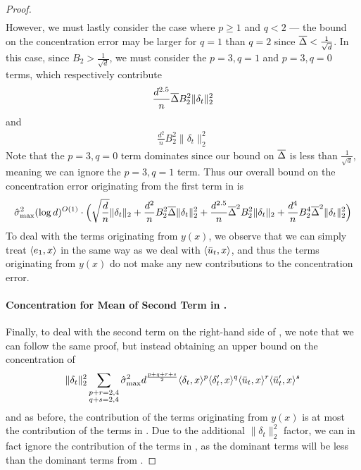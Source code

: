 \begin{proof}
\begin{align}
\end{align}
However, we must lastly consider the case where $p \geq 1$ and $q < 2$ --- the bound on the concentration error may be larger for $q = 1$ than $q = 2$ since $\overline{\Delta} < \frac{1}{\sqrt{d}}$. In this case, since $B_2 > \frac{1}{\sqrt{d}}$, we must consider the $p = 3, q = 1$ and $p = 3, q = 0$ terms, which respectively contribute
\begin{align}
\frac{d^{2.5}}{n} \overline{\Delta} B_2^2 \|\delta_t\|_2^2
\end{align}
and
\begin{align}
\frac{d^2}{n} B_2^2 \|\delta_t\|_2^2
\end{align}
Note that the $p = 3, q = 0$ term dominates since our bound on $\overline{\Delta}$ is less than $\frac{1}{\sqrt{d}}$, meaning we can ignore the $p = 3, q = 1$ term. Thus our overall bound on the concentration error originating from the first term in  is
\begin{align}
\hat{\sigma}_{\textup{max}}^2 (\log d)^{O(1)} \cdot \Big(\sqrt{\frac{d}{n}} \|\delta_t\|_2 + \frac{d^2}{n} B_2^2 \overline{\Delta} \|\delta_t\|_2^2 + \frac{d^{2.5}}{n} \overline{\Delta}^2 B_2^2 \|\delta_t\|_2  + \frac{d^4}{n} B_2^4 \overline{\Delta}^2 \|\delta_t\|_2^2 \Big)
\end{align}
To deal with the terms originating from $y(x)$, we observe that we can simply treat $\langle e_1, x \rangle$ in the same way as we deal with $\langle \bar{u}_t, x \rangle$, and thus the terms originating from $y(x)$ do not make any new contributions to the concentration error. 

\paragraph{Concentration for Mean of Second Term in .} Finally, to deal with the second term on the right-hand side of , we note that we can follow the same proof, but instead obtaining an upper bound on the concentration of 
\begin{align} \label{eq:concentration_goal_higher_order}
\|\delta_t\|_2^2 \sum_{\substack{p + r = 2, 4 \\ q + s = 2, 4}} \hat{\sigma}_{\textup{max}}^2 d^{\frac{p + q + r + s}{2}} \langle \delta_t, x \rangle^{p} \langle \delta_t', x \rangle^q \langle \bar{u}_t, x \rangle^r \langle \bar{u}_t', x \rangle^s
\end{align}
and as before, the contribution of the terms originating from $y(x)$ is at most the contribution of the terms in . Due to the additional $\|\delta_t\|_2^2$ factor, we can in fact ignore the contribution of the terms in , as the dominant terms will be less than the dominant terms from .


\end{proof}
